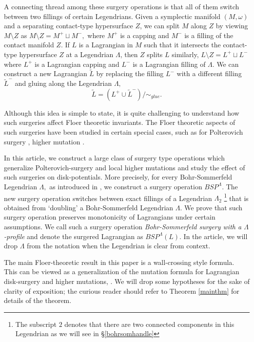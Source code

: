 \documentclass[11pt, oneside,dvipsnames]{amsart}
\newcommand{\wt}{\widetilde}
\newcommand{\<}{\langle}
\renewcommand{\>}{\rangle}
\newcommand{\sm}{\ensuremath{\setminus}}
\theoremstyle{definition}
\theoremstyle{definition}
\numberwithin{equation}{subsection}
\begin{document}
A connecting thread among these surgery operations is that all of them switch between two  fillings of certain Legendrians. Given a symplectic manifold $(M,\omega)$  and a separating contact-type hypersurface $Z$, we can split   $M$  along $Z$  by viewing $M\sm Z$  as $ M\sm Z = M^+ \sqcup M^- ,$ where $M^+$ is a capping  and $M^-$ is a filling of the contact manifold $Z$.  If $L$ is a Lagrangian in $M$ such that it intersects the contact-type hypersurface $Z$ at a Legendrian $\Lambda$, then $Z$ splits $L$ similarly,
$ L \sm Z = L^+ \sqcup L^-$
where $L^+$ is a Lagrangian capping and $L^- $ is a Lagrangian filling of $\Lambda$. We can construct a new Lagrangian $\wt L$ by replacing the filling $L^-$ with a different filling $\wt L^-$ and gluing along the Legendrian $\Lambda,$
$$\wt L = (L^+ \cup \wt L^- )/ \sim_{glue} .$$



Although this idea is simple to state, it is quite challenging to understand how such surgeries affect Floer theoretic invariants. The Floer theoretic aspects of such surgeries have been studied  in certain special cases, such as for  Polterovich surgery  \cite{ch10,PW19,seidelFuk}, higher mutation  \cite{PT20,Cha23}.

In this article, we construct a large class of surgery type operations which generalize  Polterovich-surgery and local higher mutations and study the effect of such surgeries on disk-potentials. More precisely, for every Bohr-Sommerfeld Legendrian $\Lambda,$ as introduced in \cite{rg19}, we construct a surgery operation $BSP^\Lambda$.
The new surgery operation switches between exact fillings of a Legendrian $\Lambda_2$ \footnote{The subscript $2$ denotes that there are two connected components in this Legendrian as we will see in \S \ref{bohrsomhandle} } that is obtained from `doubling' a Bohr-Sommerfeld Legendrian $\Lambda$. We prove that such surgery operation preserves monotonicity of Lagrangians under certain assumptions. We call such a surgery operation \textit{ Bohr-Sommerfeld surgery with a $\Lambda$-profile}  and denote the surgered Lagrangian as $BSP^\Lambda(L)$. In the article, we will drop ${\Lambda}$ from the notation when the Legendrian is clear from context.

The main Floer-theoretic result in this paper is a wall-crossing style formula. This can be viewed as a generalization of the mutation formula for Lagrangian disk-surgery and higher mutations,  \cite{Aur07,PT20, PW19}. We will drop some hypotheses for the sake of clarity of exposition; the curious reader should refer to Theorem \ref{mainthm} for  details of the theorem.
 
\end{document}
